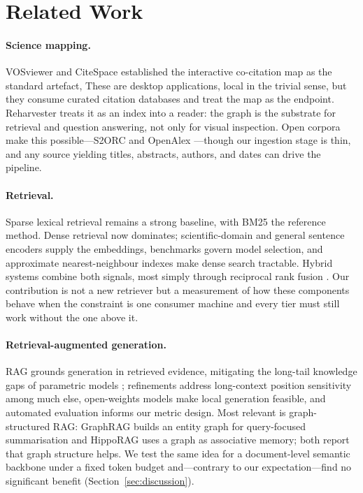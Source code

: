 \documentclass[runningheads]{llncs}
\begin{document}
\section{Related Work}
\label{sec:related}

\paragraph{Science mapping.}
VOSviewer \cite{eck2009} and CiteSpace \cite{chen2005} established the interactive
co-citation map as the standard artefact, These are desktop applications, local in the trivial sense,
but they consume curated citation databases and treat the map as the endpoint.
Reharvester treats it as an index into a reader: the graph is the substrate for
retrieval and question answering, not only for visual inspection. Open corpora make this
possible---S2ORC \cite{lo2020} and OpenAlex \cite{priem2022}---though our ingestion
stage is thin, and any source yielding titles, abstracts, authors, and dates can drive
the pipeline.

\paragraph{Retrieval.}
Sparse lexical retrieval remains a strong baseline, with BM25 \cite{robertson2009} the
reference method. Dense retrieval \cite{karpukhin2020a,izacard2021} now dominates;
scientific-domain \cite{beltagy2019a} and general sentence encoders \cite{reimers2019a}
supply the embeddings, benchmarks \cite{thakur2021} govern model selection, and
approximate nearest-neighbour indexes \cite{malkov2020} make dense search tractable.
Hybrid systems combine both signals, most simply through reciprocal rank fusion
\cite{cormack2009}. Our contribution is not a new retriever but a measurement of how
these components behave when the constraint is one consumer machine and every tier
must still work without the one above it.

\paragraph{Retrieval-augmented generation.}
RAG \cite{lewis2020} grounds generation in retrieved evidence, mitigating the long-tail
knowledge gaps of parametric models \cite{kandpal2022}; refinements address long-context
position sensitivity \cite{liu2024} among much else, open-weights models
\cite{jiang2023} make local generation feasible, and automated evaluation \cite{es2024}
informs our metric design. Most relevant is graph-structured RAG: GraphRAG
\cite{edge2024} builds an entity graph for query-focused summarisation and HippoRAG
\cite{gutirrez2024a} uses a graph as associative memory; both report that graph structure
helps. We test the same idea for a document-level semantic backbone under a fixed token
budget and---contrary to our expectation---find no significant benefit
(Section~\ref{sec:discussion}).
\end{document}
